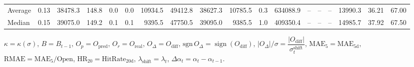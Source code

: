\begin{threeparttable}
{\begin{tabular}{lrrrrrrrrrrrrrrrrr}
Average &     0.13 & 38478.3 &             148.8 &               0.0 &                0.0 &            10934.5 & 49412.8 & 38627.3 &    10785.5 &                      0.3 &            634088.9 &         -- &        -- &             -- &          13990.3 &           36.21 &                  67.00 \\
 Median &     0.15 & 39075.0 &             149.2 &               0.1 &                0.1 &             9395.5 & 47750.5 & 39095.0 &     9385.5 &                      1.0 &            409350.4 &         -- &        -- &             -- &          14985.7 &           37.92 &                  67.50 \\
\bottomrule
\end{tabular}
}
\begin{tablenotes}\footnotesize
\item $\kappa=\kappa(\sigma)$, $B=B_{t-1}$, $O_p=O_{\text{pred}}$, $O_r=O_{\text{real}}$, $O_\Delta=O_{\text{diff}}$, $\mathrm{sgn}\,O_\Delta=\operatorname{sign}(O_{\text{diff}})$, $|O_\Delta|/\sigma=\dfrac{|O_{\text{diff}}|}{\sigma_t^{\text{shift}}}$, $\mathrm{MAE}_5=\mathrm{MAE}_{5\text{d}}$, $\mathrm{RMAE}= \mathrm{MAE}_5 / \text{Open}$, $\mathrm{HR}_{20}=\mathrm{HitRate}_{20\text{d}}$, 
$\lambda_{\text{shift}}=\lambda_t$, 
$\Delta\alpha_t=\alpha_t-\alpha_{t-1}$.
\end{tablenotes}
\end{threeparttable}
\endgroup

